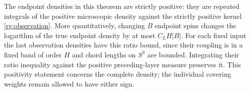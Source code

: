 The endpoint densities in this theorem are strictly positive:
they are repeated integrals of the positive microscopic
density against the strictly positive kernel
\eqref{rg:observation}.  More quantitatively, changing $B$
endpoint spins changes the logarithm of the true endpoint
density by at most $C_LH|B|$.  For each fixed input the
last observation densities have this ratio bound, since
their coupling is in a fixed band of order $H$ and chord
lengths on $S^3$ are bounded.  Integrating their ratio
inequality against the positive preceding-layer measure
preserves it.  This positivity statement concerns the
complete density; the individual covering weights remain
allowed to have either sign.


